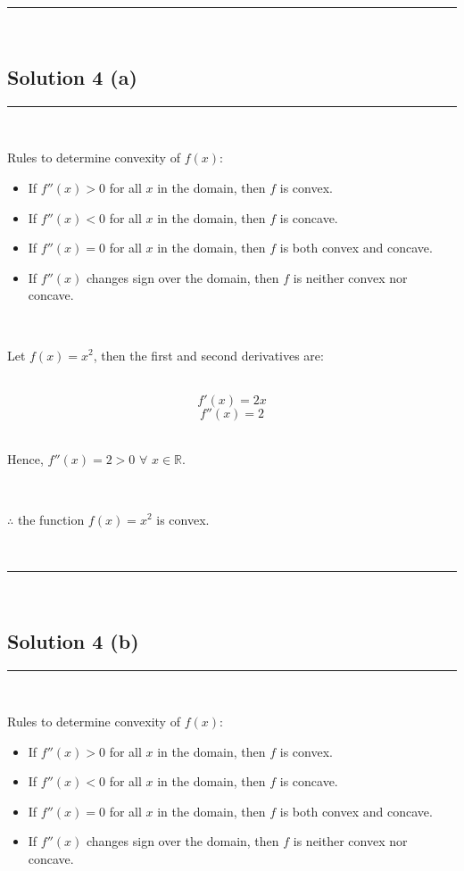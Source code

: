 \documentclass{article}
\begin{document}
\noindent\rule{\textwidth}{0.4pt}\\

\newpage

\subsection*{Solution 4 (a)}
\noindent\rule{\textwidth}{0.4pt}\\

\parbox{\textwidth}{
Rules to determine convexity of $f(x)$:
\begin{itemize}
    \item If $f''(x) > 0$ for all $x$ in the domain, then $f$ is convex.
    \item If $f''(x) < 0$ for all $x$ in the domain, then $f$ is concave.
    \item If $f''(x) = 0$ for all $x$ in the domain, then $f$ is both convex and concave.
    \item If $f''(x)$ changes sign over the domain, then $f$ is neither convex nor concave.
\end{itemize}
}\\

\parbox{\textwidth}{
Let $f(x) = x^2$, then the first and second derivatives are:
}\\

$$f'(x) = 2x$$
$$f''(x) = 2$$\\

\parbox{\textwidth}{
Hence, $f''(x) = 2 > 0$ $\forall$ $x \in \mathbb{R}$.
}\\

\parbox{\textwidth}{
$\therefore$ the function $f(x) = x^2$ is convex.
}\\

\noindent\rule{\textwidth}{0.4pt}\\

\newpage

\subsection*{Solution 4 (b)}
\noindent\rule{\textwidth}{0.4pt}\\

\parbox{\textwidth}{
Rules to determine convexity of $f(x)$:
\begin{itemize}
    \item If $f''(x) > 0$ for all $x$ in the domain, then $f$ is convex.
    \item If $f''(x) < 0$ for all $x$ in the domain, then $f$ is concave.
    \item If $f''(x) = 0$ for all $x$ in the domain, then $f$ is both convex and concave.
    \item If $f''(x)$ changes sign over the domain, then $f$ is neither convex nor concave.
\end{itemize}
}\\
\end{document}
